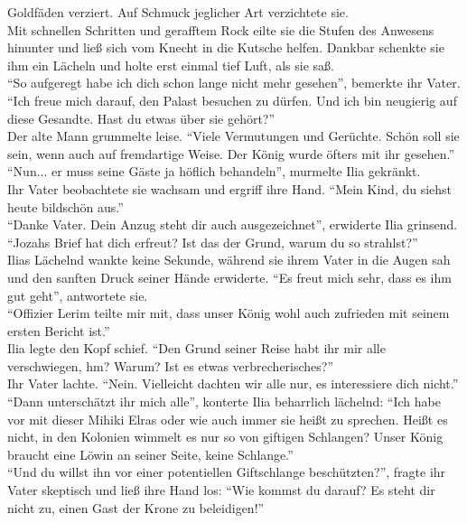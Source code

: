 Goldfäden verziert. Auf Schmuck jeglicher Art verzichtete sie. \\
Mit schnellen Schritten und gerafftem Rock eilte sie die Stufen des Anwesens hinunter und ließ sich 
vom Knecht in die Kutsche helfen. Dankbar schenkte sie ihm ein Lächeln und holte erst einmal tief 
Luft, als sie saß.\\
``So aufgeregt habe ich dich schon lange nicht mehr gesehen'', bemerkte ihr Vater.\\
``Ich freue mich darauf, den Palast besuchen zu dürfen. Und ich bin neugierig auf diese Gesandte. 
Hast du etwas über sie gehört?''\\
Der alte Mann grummelte leise. ``Viele Vermutungen und Gerüchte. Schön soll sie sein, wenn auch 
auf fremdartige Weise. Der König wurde öfters mit ihr gesehen.''\\
``Nun... er muss seine Gäste ja höflich behandeln'', murmelte Ilia gekränkt.\\
Ihr Vater beobachtete sie wachsam und ergriff ihre Hand. ``Mein Kind, du siehst heute bildschön 
aus.''\\
``Danke Vater. Dein Anzug steht dir auch ausgezeichnet'', erwiderte Ilia grinsend.\\
``Jozahs Brief hat dich erfreut? Ist das der Grund, warum du so strahlst?''\\
Ilias Lächelnd wankte keine Sekunde, während sie ihrem Vater in die Augen sah und den sanften Druck 
seiner Hände erwiderte. ``Es freut mich sehr, dass es ihm gut geht'', antwortete sie.\\
``Offizier Lerim teilte mir mit, dass unser König wohl auch zufrieden mit seinem ersten Bericht 
ist.''\\
Ilia legte den Kopf schief. ``Den Grund seiner Reise habt ihr mir alle verschwiegen, hm? Warum? Ist 
es etwas verbrecherisches?''\\
Ihr Vater lachte. ``Nein. Vielleicht dachten wir alle nur, es interessiere dich nicht.''\\
``Dann unterschätzt ihr mich alle'', konterte Ilia beharrlich lächelnd: ``Ich habe vor mit dieser 
Mihiki Elras oder wie auch immer sie heißt zu sprechen. Heißt es nicht, in den Kolonien wimmelt es 
nur so von giftigen Schlangen? Unser König braucht eine Löwin an seiner Seite, keine Schlange.''\\
``Und du willst ihn vor einer potentiellen Giftschlange beschützten?'', fragte ihr Vater skeptisch 
und ließ ihre Hand los: ``Wie kommst du darauf? Es steht dir nicht zu, einen Gast der Krone zu 
beleidigen!''\\
